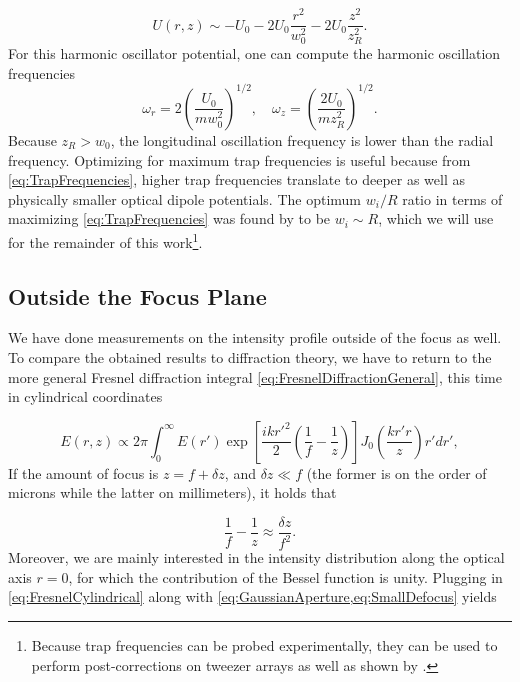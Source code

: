\begin{equation}\label{eq:ApproximateGaussianPotential}
	U(r,z) \sim -U_0 - 2U_0 \frac{r^2}{w_0^2} - 2U_0 \frac{z^2}{z_R^2}.
\end{equation}
For this harmonic oscillator potential, one can compute the harmonic oscillation frequencies 
\begin{equation}\label{eq:TrapFrequencies}
	\omega_r = 2\left(\frac{U_0}{m w_0^2}\right)^{1/2}, \quad
	\omega_z= \left(\frac{2 U_0}{m z_R^2}\right)^{1/2}.
\end{equation}
Because $z_R > w_0$, the longitudinal oscillation frequency is lower than the radial frequency. 
Optimizing for maximum trap frequencies is useful because from \cref{eq:TrapFrequencies}, higher trap frequencies translate to deeper as well as physically smaller optical dipole potentials.
The optimum $w_i/R$ ratio in terms of maximizing \cref{eq:TrapFrequencies} was found by \cite{Madjarov2021} to be $w_i\sim R$, which we will use for the remainder of this work\footnote{Because trap frequencies can be probed experimentally, they can be used to perform post-corrections on tweezer arrays as well as shown by \cite{Ebadi2021}.}.

\subsection{Outside the Focus Plane}

We have done measurements on the intensity profile outside of the focus as well.
To compare the obtained results to diffraction theory, we have to return to the more general Fresnel diffraction integral \cref{eq:FresnelDiffractionGeneral}, this time in cylindrical coordinates \cite{Gu2000}

\begin{equation}\label{eq:FresnelCylindrical}
	E(r,z) \propto 2\pi
	\int_0^\infty E(r')\exp{\left[\frac{i k r'^2}{2}\left(\frac{1}{f}-\frac{1}{z}\right)\right]}
	J_0\left(\frac{k r'r}{z}\right)r' dr',
\end{equation}
If the amount of focus is $z=f+\delta z$, and $\delta z \ll f$ (the former is on the order of microns while the latter on millimeters), it holds that

\begin{equation}\label{eq:SmallDefocus}
	\frac{1}{f}-\frac{1}{z}\approx
	\frac{\delta z}{f^2}.
\end{equation}
Moreover, we are mainly interested in the intensity distribution along the optical axis $r=0$, for which the contribution of the Bessel function is unity.
Plugging in \cref{eq:FresnelCylindrical} along with \cref{eq:GaussianAperture,eq:SmallDefocus} yields

